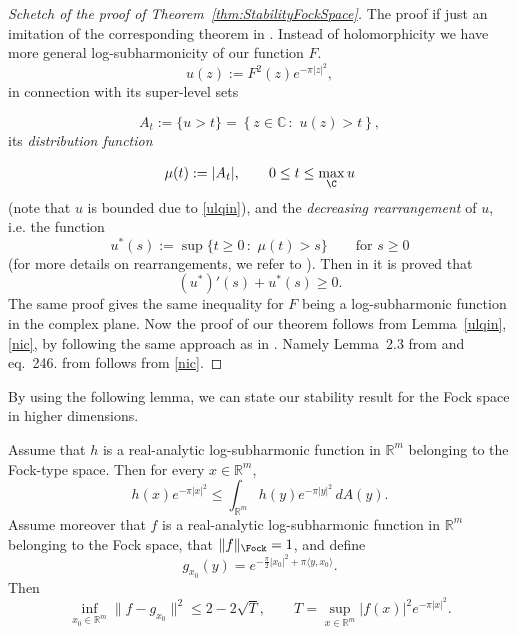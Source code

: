 \begin{proof}[Schetch of the proof of Theorem~\ref{thm:StabilityFockSpace}]
The proof if just an imitation of the corresponding theorem in \cite{GomezGuerraRamosTilli2024}. Instead of holomorphicity we have more general log-subharmonicity of our function $F$.
\begin{equation}
\label{defu}
u(z):=F^2(z) e^{-\pi|z|^2},
\end{equation}
in connection with its super-level sets



\begin{equation}
\label{defAt}
A_t:=\{u>t\}=\left\{z\in\mathbb{C}\,:\,\, u(z)>t\right\},
\end{equation}
its \emph{distribution function}




\begin{equation}
\label{defmu}
\mu(t):= |A_t|,\qquad 0\leq t\leq \max_{\C} u
\end{equation}
(note that $u$ is bounded due to \eqref{ulqin}),
and the \emph{decreasing rearrangement} of $u$, i.e. the function
\begin{equation}
\label{defclassu*}
u^*(s):=\sup\{t\geq 0\,:\,\, \mu(t)>s\}\qquad \text{for $s\geq 0$}
\end{equation}
(for more details on rearrangements, we refer to  \cite{baernstein}).
Then in \cite{Nicola} it is proved that \begin{equation}\label{nic}(u^\ast)'(s)+u^\ast(s)\ge 0. \end{equation}
The same proof gives the same inequality for $F$ being a log-subharmonic function in the complex plane. Now the proof of our theorem follows from Lemma~\ref{ulqin}, \eqref{nic}, by following the same approach as in \cite{GomezGuerraRamosTilli2024}. Namely  Lemma~2.3 from  \cite{GomezGuerraRamosTilli2024} and  eq.~246. from \cite{GomezGuerraRamosTilli2024} follows from \eqref{nic}.

\end{proof}

By using the following lemma, we can state our stability result for the Fock space in higher dimensions.
\begin{numlemma}\label{ulqin2024}
Assume that \(h\) is a real-analytic log-subharmonic function in \(\mathbb{R}^m\) belonging to the Fock-type space. Then for every \(x\in \mathbb{R}^m\),
\begin{equation}\label{sharine1}
h(x)e^{-\pi |x|^2}\le  \int_{\mathbb{R}^m} h(y) e^{-\pi |y|^2}\, dA(y).
\end{equation}
Assume moreover that \(f\) is a real-analytic log-subharmonic function in \(\mathbb{R}^m\) belonging to the Fock space, that \(\|f\|_{\Fock}=1\), and define
\[
g_{x_0}(y)= e^{-\frac{\pi}{2} |x_0|^2+\pi \langle y,x_0\rangle}.
\]
Then
\begin{equation}\label{ulqin1}
\inf_{x_0\in \mathbb{R}^m}\|f-g_{x_0}\|^2\le 2-2 \sqrt{T},
\qquad
T=\sup_{x\in \mathbb{R}^m} |f(x)|^2e^{-\pi |x|^2}.
\end{equation}
\end{numlemma}

